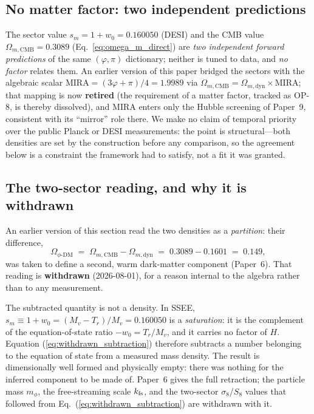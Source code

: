 \documentclass[12pt,a4paper]{article}
\begin{document}
\subsection{No matter factor: two independent predictions}
\label{sec:mira_timeline}

The sector value $s_m=1+w_0=0.160050$ (DESI) and the CMB value
$\Omega_{m,\mathrm{CMB}}=0.3089$ (Eq.~\ref{eq:omega_m_direct}) are \emph{two
independent forward predictions} of the same $(\varphi,\pi)$ dictionary; neither is
tuned to data, and \emph{no factor} relates them. An earlier version of this paper
bridged the sectors with the algebraic scalar
$\mathrm{MIRA}=(3\varphi+\pi)/4=1.9989$ via
$\Omega_{m,\mathrm{CMB}}=\Omega_{m,\mathrm{dyn}}\times\mathrm{MIRA}$; that mapping is
now \textbf{retired} (the requirement of a matter factor, tracked as OP-8, is thereby
dissolved), and MIRA enters only the Hubble screening of Paper~9, consistent with its
``mirror'' role there. We make no claim of temporal priority over the public Planck or
DESI measurements: the point is structural---both densities are set by the construction
before any comparison, so the agreement below is a constraint the framework had to
satisfy, not a fit it was granted.

\subsection{The two-sector reading, and why it is withdrawn}
\label{sec:two_sector_physics}

An earlier version of this section read the two densities as a \emph{partition}:
their difference,
\begin{equation}
  \Omega_{\phi\text{-DM}}
    \;=\; \Omega_{m,\mathrm{CMB}} - \Omega_{m,\mathrm{dyn}}
    \;=\; 0.3089 - 0.1601 \;=\; 0.149 ,
  \label{eq:withdrawn_subtraction}
\end{equation}
was taken to define a second, warm dark-matter component (Paper~6).
That reading is \textbf{withdrawn} (2026-08-01), for a reason internal to
the algebra rather than to any measurement.

The subtracted quantity is not a density. In SSEE,
$s_m \equiv 1+w_0 = (M_v-T_r)/M_v = 0.160050$ is a
\emph{saturation}: it is the complement of the equation-of-state ratio
$-w_0 = T_r/M_v$, and it carries no factor of $H$. Equation
(\ref{eq:withdrawn_subtraction}) therefore subtracts a number belonging to the
equation of state from a measured mass density. The result is dimensionally
well formed and physically empty: there was nothing for the inferred component
to be made of. Paper~6 gives the full retraction; the particle mass
$m_\phi$, the free-streaming scale $k_{\rm fs}$, and the two-sector
$\sigma_8$/$S_8$ values that followed from
Eq.~(\ref{eq:withdrawn_subtraction}) are withdrawn with it.
\end{document}
